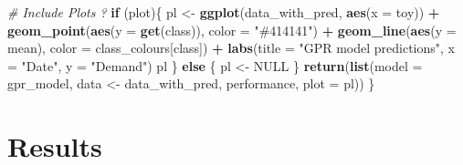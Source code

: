 \documentclass[
]{article}
\newenvironment{Shaded}{\begin{snugshade}}{\end{snugshade}}
\newcommand{\CommentTok}[1]{\textcolor[rgb]{0.56,0.35,0.01}{\textit{#1}}}
\newcommand{\ControlFlowTok}[1]{\textcolor[rgb]{0.13,0.29,0.53}{\textbf{#1}}}
\newcommand{\DataTypeTok}[1]{\textcolor[rgb]{0.13,0.29,0.53}{#1}}
\newcommand{\KeywordTok}[1]{\textcolor[rgb]{0.13,0.29,0.53}{\textbf{#1}}}
\newcommand{\NormalTok}[1]{#1}
\newcommand{\OperatorTok}[1]{\textcolor[rgb]{0.81,0.36,0.00}{\textbf{#1}}}
\newcommand{\OtherTok}[1]{\textcolor[rgb]{0.56,0.35,0.01}{#1}}
\newcommand{\StringTok}[1]{\textcolor[rgb]{0.31,0.60,0.02}{#1}}
\begin{document}
\begin{Shaded}
\begin{Highlighting}[]
  \CommentTok{\# Include Plots ?}
  \ControlFlowTok{if}\NormalTok{ (plot)\{}
\NormalTok{    pl \textless{}{-}}\StringTok{ }\KeywordTok{ggplot}\NormalTok{(data\_with\_pred, }\KeywordTok{aes}\NormalTok{(}\DataTypeTok{x =}\NormalTok{ toy)) }\OperatorTok{+}
\StringTok{      }\KeywordTok{geom\_point}\NormalTok{(}\KeywordTok{aes}\NormalTok{(}\DataTypeTok{y =} \KeywordTok{get}\NormalTok{(class)), }\DataTypeTok{color =} \StringTok{"\#414141"}\NormalTok{) }\OperatorTok{+}
\StringTok{      }\KeywordTok{geom\_line}\NormalTok{(}\KeywordTok{aes}\NormalTok{(}\DataTypeTok{y =}\NormalTok{ mean), }\DataTypeTok{color =}\NormalTok{ class\_colours[class]) }\OperatorTok{+}
\StringTok{      }\KeywordTok{labs}\NormalTok{(}\DataTypeTok{title =} \StringTok{"GPR model predictions"}\NormalTok{,}
           \DataTypeTok{x =} \StringTok{"Date"}\NormalTok{, }\DataTypeTok{y =} \StringTok{"Demand"}\NormalTok{)}
\NormalTok{    pl}
\NormalTok{  \} }\ControlFlowTok{else}\NormalTok{ \{}
\NormalTok{    pl \textless{}{-}}\StringTok{ }\OtherTok{NULL}
\NormalTok{  \}}
  \KeywordTok{return}\NormalTok{(}\KeywordTok{list}\NormalTok{(}\DataTypeTok{model =}\NormalTok{ gpr\_model,}
\NormalTok{              data \textless{}{-}}\StringTok{ }\NormalTok{data\_with\_pred,}
\NormalTok{              performance,}
              \DataTypeTok{plot =}\NormalTok{ pl))}
\NormalTok{\}}
\end{Highlighting}
\end{Shaded}

\hypertarget{results}{%
\section{Results}\label{results}}
\end{document}

